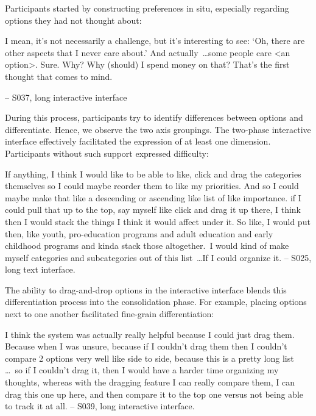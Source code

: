 Participants started by constructing preferences in situ, especially regarding options they had not thought about:
\begin{displayquote}

    I mean, it's not necessarily a challenge, but it's interesting to see: `Oh, there are other aspects that I never care about.' And actually~\ldots some people care <an option>. Sure. Why? Why (should) I spend money on that? That's the first thought that comes to mind.
    
    \noindent \hfill -- S037, long interactive interface
\end{displayquote}

During this process, participants try to identify differences between options and differentiate. Hence, we observe the two axis groupings. The two-phase interactive interface effectively facilitated the expression of at least one dimension. Participants without such support expressed difficulty:

\begin{displayquote}
    If anything, I think I would like to be able to like, click and drag the categories themselves so I could maybe reorder them to like my priorities. And so I could maybe make that like a descending or ascending like list of like importance. \bracketellipsis if I could pull that up to the top, say myself like click and drag it up there, I think then I would stack the things I think it would affect under it. So like, I would put then, like youth, pro-education programs and adult education and early childhood programs and kinda stack those altogether.~\bracketellipsis I would kind of make myself categories and subcategories out of this list~\ldots If I could organize it.
    \noindent \hfill -- S025, long text interface.
\end{displayquote}

The ability to drag-and-drop options in the interactive interface blends this differentiation process into the consolidation phase. For example, placing options next to one another facilitated fine-grain differentiation:

\begin{displayquote}
    I think the system was actually really helpful because I could just drag them. \bracketellipsis Because when I was unsure, because if I couldn't drag them then I couldn't compare 2 options very well like side to side, because this is a pretty long list \ldots\ so if I couldn't drag it, then I would have a harder time organizing my thoughts, whereas with the dragging feature I can really compare them, I can drag this one up here, and then compare it to the top one versus not being able to track it at all.
    \noindent \hfill -- S039, long interactive interface.
\end{displayquote}

